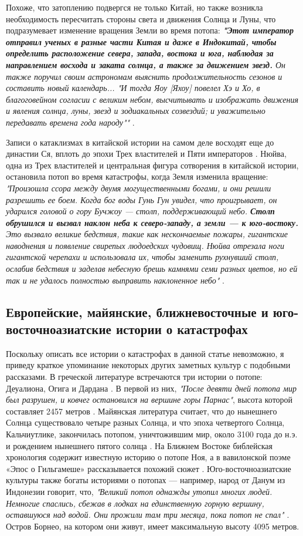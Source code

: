 \documentclass[10pt,twocolumn,letterpaper]{article}
\begin{document}
Похоже, что затоплению подвергся не только Китай, но также возникла необходимость пересчитать стороны света и движения Солнца и Луны, что подразумевает изменение вращения Земли во время потопа: \textit{\textbf{"Этот император отправил ученых в разные части Китая и даже в Индокитай, чтобы определить расположение севера, запада, востока и юга, наблюдая за направлением восхода и заката солнца, а также за движением звезд.} Он также поручил своим астрономам выяснить продолжительность сезонов и составить новый календарь... "И тогда Яоу [Яхоу] повелел Хэ и Хо, в благоговейном согласии с великим небом, высчитывать и изображать движения и явления солнца, луны, звезд и зодиакальных созвездий; и уважительно передавать времена года народу""} \cite{5}.

Записи о катаклизмах в китайской истории на самом деле восходят еще до династии Ся, вплоть до эпохи Трех властителей и Пяти императоров \cite{7}. Нюйва, одна из Трех властителей и центральная фигура сотворения в китайской истории, остановила потоп во время катастрофы, когда Земля изменила вращение: \textit{"Произошла ссора между двумя могущественными богами, и они решили разрешить ее боем. Когда бог воды Гунь Гун увидел, что проигрывает, он ударился головой о гору Бучжоу — столп, поддерживающий небо. \textbf{Столп обрушился и вызвал наклон неба к северо-западу, а земли — к юго-востоку.} Это вызвало великие бедствия, такие как нескончаемые пожары, гигантские наводнения и появление свирепых людоедских чудовищ. Нюйва отрезала ноги гигантской черепахи и использовала их, чтобы заменить рухнувший столп, ослабив бедствия и заделав небесную брешь камнями семи разных цветов, но ей так и не удалось полностью выправить наклоненное небо"} \cite{8}.

\subsection{Европейские, майянские, ближневосточные и юго-восточноазиатские истории о катастрофах}

Поскольку описать все истории о катастрофах в данной статье невозможно, я приведу краткое упоминание некоторых других заметных культур с подобными рассказами. В греческой литературе встречаются три истории о потопе: Деуалиона, Огига и Дардана \cite{9,10}. В первой из них, \textit{"После девяти дней потопа мир был разрушен, и ковчег остановился на вершине горы Парнас"}, высота которой составляет 2457 метров \cite{11}. Майянская литература считает, что до нынешнего Солнца существовало четыре разных Солнца, и что эпоха четвертого Солнца, Кальчиутлике, закончилась потопом, уничтожившим мир, около 3100 года до н.э. и рождением нынешнего пятого солнца \cite{12}. На Ближнем Востоке библейская хронология содержит известную историю о потопе Ноя, а в вавилонской поэме «Эпос о Гильгамеше» рассказывается похожий сюжет \cite{13}. Юго-восточноазиатские культуры также богаты историями о потопах — например, народ от Данум из Индонезии говорит, что, \textit{"Великий потоп однажды утопил многих людей. Немногие спаслись, сбежав в лодках на единственную горную вершину, оставшуюся над водой. Они прожили там три месяца, пока потоп не спал"} \cite{3}. Остров Борнео, на котором они живут, имеет максимальную высоту 4095 метров.
\end{document}
